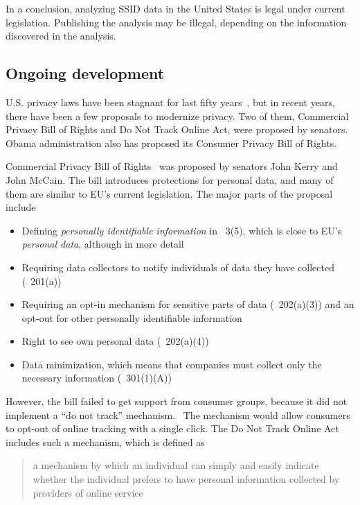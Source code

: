 \documentclass[12pt,a4paper,oneside,pdftex]{report}
\begin{document}
In a conclusion, analyzing SSID data in the United States is legal under current legislation. Publishing the analysis may be illegal, depending on the information discovered in the analysis.

\subsection{Ongoing development}

U.S. privacy laws have been stagnant for last fifty years~\cite{richards2010prosser}, but in recent years, there have been a few proposals to modernize privacy. Two of them, Commercial Privacy Bill of Rights and Do Not Track Online Act, were proposed by senators. Obama administration also has proposed its Consumer Privacy Bill of Rights.

Commercial Privacy Bill of Rights~\cite{com_pbr} was proposed by senators John Kerry and John McCain. The bill introduces protections for personal data, and  many of them are similar to EU's current legislation. The major parts of the proposal include

\begin{itemize}
    \item Defining \emph{personally identifiable information} in \textsection~3(5), which is close to EU's \emph{personal data}, although in more detail
    \item Requiring data collectors to notify individuals of data they have collected (\textsection~201(a))
    \item Requiring an opt-in mechanism for sensitive parts of data (\textsection~202(a)(3)) and an opt-out for other personally identifiable information
    \item Right to see own personal data (\textsection~202(a)(4))
    \item Data minimization, which means that companies must collect only the necessary information (\textsection~301(1)(A))
\end{itemize}

However, the bill failed to get support from consumer groups, because it did not implement a ``do not track'' mechanism.~\cite{jennings2012track} The mechanism would allow consumers to opt-out of online tracking with a single click. The Do Not Track Online Act~\cite{donottrack_act} includes such a mechanism, which is defined as

\begin{quote}
    a mechanism by which an individual can simply and easily indicate whether the individual prefers to have personal information collected by providers of online service
\end{quote}
\end{document}
